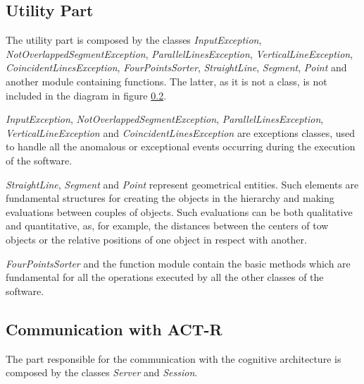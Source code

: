 	\subsection{Utility Part}
	The utility part is composed by the classes \emph{InputException}, \emph{NotOverlappedSegmentException}, \emph{ParallelLinesException}, \emph{VerticalLineException}, \emph{CoincidentLinesException}, \emph{FourPointsSorter}, \emph{StraightLine}, \emph{Segment}, \emph{Point} and another module containing functions. The latter, as it is not a class, is not included in the diagram in figure \ref{}. 

	\emph{InputException}, \emph{NotOverlappedSegmentException}, \emph{ParallelLinesException}, \emph{VerticalLineException} and \emph{CoincidentLinesException} are exceptions classes, used to handle all the anomalous or exceptional events occurring during the execution of the software. 

	\emph{StraightLine}, \emph{Segment} and \emph{Point} represent geometrical entities. Such elements are fundamental structures for creating the objects in the hierarchy and making evaluations between couples of objects.
	Such evaluations can be both qualitative and quantitative, as, for example, the distances between the centers of tow objects or the relative positions of one object in respect with another.

	\emph{FourPointsSorter} and the function module contain the basic methods which are fundamental for all the operations executed by all the other classes of the software.


	\subsection{Communication with ACT-R}
	The part responsible for the communication with the cognitive architecture is composed by the classes \emph{Server} and \emph{Session}. 
	


 

